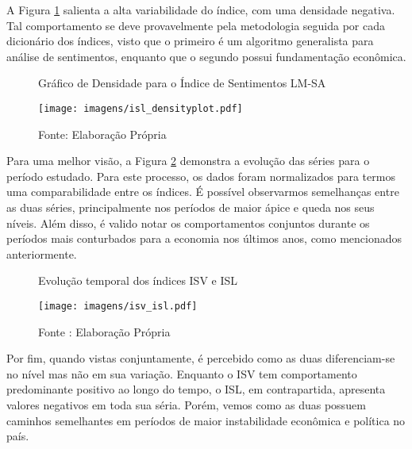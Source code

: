 A Figura \ref{fig: ISL density} salienta a alta variabilidade do índice, com uma densidade negativa. Tal comportamento se deve provavelmente pela metodologia seguida por cada dicionário dos índices, visto que o primeiro é um algoritmo generalista para análise de sentimentos, enquanto que o segundo possui fundamentação econômica.

\begin{figure}[!h]
    \centering
    \caption{Gráfico de Densidade para o Índice de Sentimentos LM-SA}
    \texttt{[image: imagens/isl\_densityplot.pdf]}
    \caption*{Fonte: Elaboração Própria}
    \label{fig: ISL density}
\end{figure}

Para uma melhor visão, a Figura \ref{fig: vaderxlmsa} demonstra a evolução das séries para o período estudado. Para este processo, os dados foram normalizados para termos uma comparabilidade entre os índices. É possível observarmos semelhanças entre as duas séries, principalmente nos períodos de maior ápice e queda nos seus níveis. Além disso, é valido notar os comportamentos conjuntos durante os períodos mais conturbados para a economia nos últimos anos, como mencionados anteriormente.

\begin{figure}[!h]
    \centering
    \caption{Evolução temporal dos índices ISV e ISL}
    \label{fig: vaderxlmsa}
    \texttt{[image: imagens/isv\_isl.pdf]}
    \caption*{Fonte : Elaboração Própria}
\end{figure}

Por fim, quando vistas conjuntamente, é percebido como as duas diferenciam-se no nível mas não em sua variação. Enquanto o ISV tem comportamento predominante positivo ao longo do tempo, o ISL, em contrapartida, apresenta valores negativos em toda sua séria. Porém, vemos como as duas possuem caminhos semelhantes em períodos de maior instabilidade econômica e política no país.



